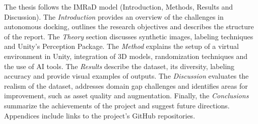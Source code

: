 The thesis follows the IMRaD model (Introduction, Methods, Results and Discussion). The \textit{Introduction} provides an overview of the challenges in autonomous docking, outlines the research objectives and describes the structure of the report. The \textit{Theory} section discusses synthetic images, labeling techniques and Unity's Perception Package. The \textit{Method} explains the setup of a virtual environment in Unity, integration of 3D models, randomization techniques and the use of AI tools. The \textit{Results} describe the dataset, its diversity, labeling accuracy and provide visual examples of outputs. The \textit{Discussion} evaluates the realism of the dataset, addresses domain gap challenges and identifies areas for improvement, such as asset quality and augmentation. Finally, the \textit{Conclusions} summarize the achievements of the project and suggest future directions.\\


\noindent Appendices include links to the project's GitHub repositories.
